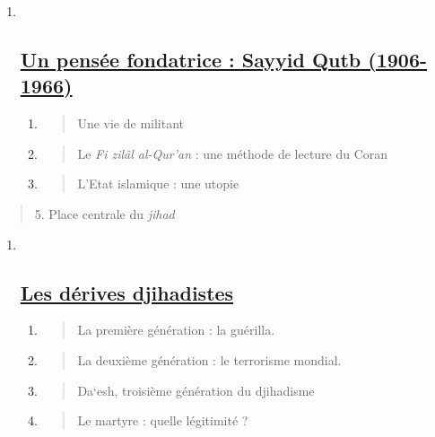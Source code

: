 \begin{enumerate}
\def\labelenumi{\Roman{enumi}.}
\item ~
  \hypertarget{un-pensuxe9e-fondatrice-sayyid-qutb-1906-1966}{%
  \subsection{\texorpdfstring{\underline{Un pensée fondatrice : Sayyid
  Qutb
  (1906-1966)}}{Un pensée fondatrice : Sayyid Qutb (1906-1966)}}\label{un-pensuxe9e-fondatrice-sayyid-qutb-1906-1966}}

  \begin{enumerate}
  \def\labelenumii{\arabic{enumii}.}
  \item
    \begin{quote}
    Une vie de militant
    \end{quote}
  \item
    \begin{quote}
    Le \emph{Fi zilâl al-Qur'an} : une méthode de lecture du Coran
    \end{quote}
  \item
    \begin{quote}
    L'Etat islamique : une utopie
    \end{quote}
  \end{enumerate}
\end{enumerate}

\begin{quote}
5. Place centrale du \emph{jihad}
\end{quote}

\begin{enumerate}
\def\labelenumi{\Roman{enumi}.}
\setcounter{enumi}{1}
\item ~
  \hypertarget{les-duxe9rives-djihadistes}{%
  \subsection{\texorpdfstring{\underline{Les dérives
  djihadistes}}{Les dérives djihadistes}}\label{les-duxe9rives-djihadistes}}

  \begin{enumerate}
  \def\labelenumii{\arabic{enumii}.}
  \item
    \begin{quote}
    La première génération : la guérilla.
    \end{quote}
  \item
    \begin{quote}
    La deuxième génération : le terrorisme mondial.
    \end{quote}
  \item
    \begin{quote}
    Da`esh, troisième génération du djihadisme
    \end{quote}
  \item
    \begin{quote}
    Le martyre : quelle légitimité ?
    \end{quote}
  \end{enumerate}
\end{enumerate}

